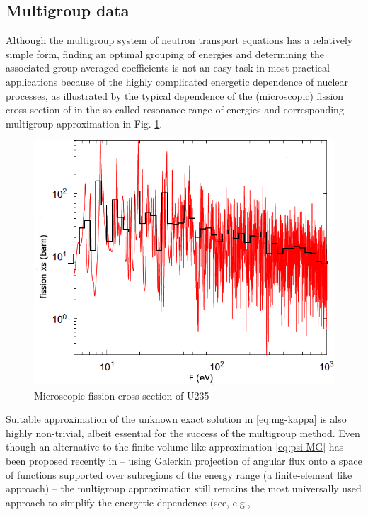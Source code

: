 \subsection{Multigroup data}
Although the multigroup system of neutron transport equations has a relatively simple form, finding an optimal grouping
of energies and determining the associated group-averaged coefficients is not an easy task in most practical
applications because of the highly complicated energetic dependence of nuclear processes, as illustrated by the typical
dependence of the (microscopic) fission cross-section of  in the so-called resonance range of
energies and corresponding multigroup approximation in Fig. \ref{fig:xs}.
\begin{figure}[htp]
\begin{center}
  \includegraphics[scale=.45]{U235fg}
  \caption{Microscopic fission cross-section of U235}
  \label{fig:xs}
\end{center}
\end{figure}
Suitable approximation of the unknown exact solution in \eqref{eq:mg-kappa} is also highly non-trivial, albeit essential
for the success of the multigroup method. Even though an alternative to the finite-volume like approximation
\eqref{eq:psi-MG} has been proposed recently  in \cite{Douglass} -- using Galerkin projection of angular flux onto a
space of functions supported over subregions of the energy range (a finite-element like approach) --  the multigroup 
approximation still remains the most universally used approach to simplify the energetic dependence (see, e.g., 
